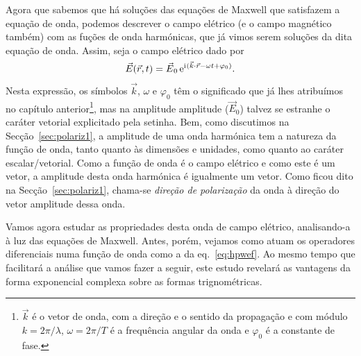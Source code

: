Agora que sabemos que há soluções das equações de Maxwell que satisfazem a
equação de onda, podemos descrever o campo elétrico (e o campo magnético também) 
com as fuções de onda harmónicas, que já vimos serem soluções da dita equação de
onda. Assim, seja o campo elétrico dado por
\begin{equation}\label{eq:hpwef}
  \vec E(\vec r,t)=\vec E_0\,\e^{\iu(\vec k\cdot\vec r-\omega t+\varphi_0)}.
\end{equation}
Nesta expressão, os símbolos $\vec k$, $\omega$ e $\varphi_0$ têm o significado que
já lhes atribuímos no capítulo anterior\footnote{$\vec k$ é o vetor de onda, com
  a direção e o sentido da propagação e com módulo $k=2\pi/\lambda$,
$\omega=2\pi/T$ é a frequência angular da onda e $\varphi_0$ é a constante de
fase.}, mas na amplitude amplitude ($\vec E_0$) talvez se estranhe o caráter
vetorial explicitado pela setinha. Bem, como discutimos na
Secção~\ref{sec:polariz1}, a amplitude de uma onda harmónica tem a natureza da
função de onda, tanto quanto às dimensões e unidades, como quanto ao caráter
escalar/vetorial. Como a função de onda é o campo elétrico e como este é um
vetor, a amplitude desta onda harmónica é igualmente um vetor. Como ficou dito
na Secção~\ref{sec:polariz1}, chama-se \emph{direção de polarização} da onda à
direção do vetor amplitude dessa onda.

Vamos agora estudar as propriedades desta onda de campo elétrico, analisando-a à
luz das equações de Maxwell. Antes, porém, vejamos como atuam os operadores
diferenciais numa função de onda como a da eq.~\eqref{eq:hpwef}. Ao mesmo tempo
que facilitará a análise que vamos fazer a seguir, este estudo revelará as
vantagens da forma exponencial complexa sobre as formas trignométricas.


